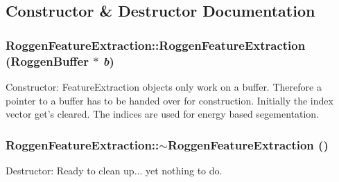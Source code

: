 \subsection{Constructor \& Destructor Documentation}
\hypertarget{classRoggenFeatureExtraction_ae05e16461ab3f18d46b2600d755acf41}{
\subsubsection[{RoggenFeatureExtraction}]{\setlength{\rightskip}{0pt plus 5cm}RoggenFeatureExtraction::RoggenFeatureExtraction ({\bf RoggenBuffer} $\ast$ {\em b})}}
\label{classRoggenFeatureExtraction_ae05e16461ab3f18d46b2600d755acf41}
Constructor: FeatureExtraction objects only work on a buffer. Therefore a pointer to a buffer has to be handed over for construction. Initially the index vector get's cleared. The indices are used for energy based segementation. \hypertarget{classRoggenFeatureExtraction_a118897a7c8adfcc48e83fc6c856771c9}{
\subsubsection[{$\sim$RoggenFeatureExtraction}]{\setlength{\rightskip}{0pt plus 5cm}RoggenFeatureExtraction::$\sim$RoggenFeatureExtraction ()}}
\label{classRoggenFeatureExtraction_a118897a7c8adfcc48e83fc6c856771c9}
Destructor: Ready to clean up... yet nothing to do. 

